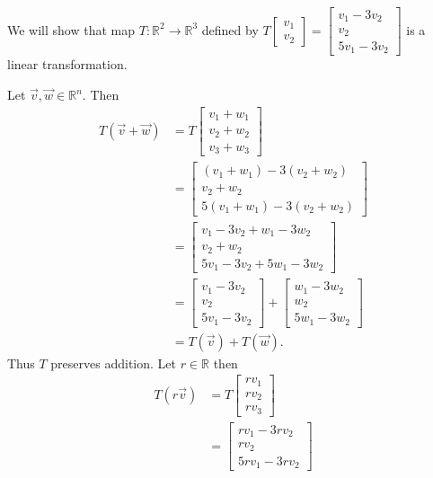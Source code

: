 \begin{example} We will show that  map $T:\mathbb{R}^2 \to \mathbb{R}^3$ 
defined by 
$T\begin{bmatrix}v_1 \\ v_2 \end{bmatrix}=
\begin{bmatrix}v_1-3v_2\\v_2\\5v_1-3v_2\end{bmatrix}$
is a linear transformation.

Let $\vec{v},\vec{w} \in \mathbb{R}^n$. Then 
\begin{align*}
T(\vec{v}+\vec{w}) 
&= T\begin{bmatrix}v_1+w_1\\v_2+w_2\\v_3+w_3\end{bmatrix}\\
&= \begin{bmatrix}(v_1+w_1)-3(v_2+w_2)\\v_2+w_2\\5(v_1+w_1)-3(v_2+w_2)\end{bmatrix}\\
&= \begin{bmatrix}v_1-3v_2+w_1-3w_2\\v_2+w_2\\5v_1-3v_2+5w_1-3w_2\end{bmatrix}\\
&= \begin{bmatrix}v_1-3v_2\\v_2\\5v_1-3v_2\end{bmatrix}
+\begin{bmatrix}w_1-3w_2\\w_2\\5w_1-3w_2\end{bmatrix}\\
&= T(\vec{v})+T(\vec{w}).
\end{align*}
Thus $T$ preserves addition. Let $r\in \mathbb{R}$ then 
\begin{align*}
T(r\vec{v}) 
&= T\begin{bmatrix}rv_1\\rv_2\\rv_3\end{bmatrix}\\
&= \begin{bmatrix}rv_1-3rv_2\\rv_2\\5rv_1-3rv_2\end{bmatrix}\\

\end{align*}
\end{example}
